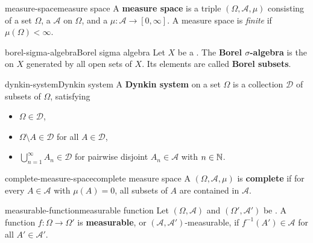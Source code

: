 \begin{topic}{measure-space}{measure space}
    A \textbf{measure space} is a triple $(\Omega, \mathcal{A}, \mu)$ consisting of a set $\Omega$, a  $\mathcal{A}$ on $\Omega$, and a  $\mu : \mathcal{A} \to [0, \infty]$. A measure space is \textit{finite} if $\mu(\Omega) < \infty$.
\end{topic}

\begin{topic}{borel-sigma-algebra}{Borel sigma algebra}
    Let $X$ be a . The \textbf{Borel $\sigma$-algebra} is the  on $X$ generated by all open sets of $X$. Its elements are called \textbf{Borel subsets}.
\end{topic}

\begin{topic}{dynkin-system}{Dynkin system}
    A \textbf{Dynkin system} on a set $\Omega$ is a collection $\mathcal{D}$ of subsets of $\Omega$, satisfying
    \begin{itemize}
        \item $\Omega \in \mathcal{D}$,
        \item $\Omega \setminus A \in \mathcal{D}$ for all $A \in \mathcal{D}$,
        \item $\bigcup_{n = 1}^\infty A_n \in \mathcal{D}$ for pairwise disjoint $A_n \in \mathcal{A}$ with $n \in \mathbb{N}$.
    \end{itemize}
\end{topic}

\begin{topic}{complete-measure-space}{complete measure space}
    A  $(\Omega, \mathcal{A}, \mu)$ is \textbf{complete} if for every $A \in \mathcal{A}$ with $\mu(A) = 0$, all subsets of $A$ are contained in $\mathcal{A}$.
\end{topic}

\begin{topic}{measurable-function}{measurable function}
    Let $(\Omega, \mathcal{A})$ and $(\Omega', \mathcal{A}')$ be . A function $f : \Omega \to \Omega'$ is \textbf{measurable}, or $(\mathcal{A}, \mathcal{A}')$-measurable, if $f^{-1}(A') \in \mathcal{A}$ for all $A' \in \mathcal{A}'$.
\end{topic}
